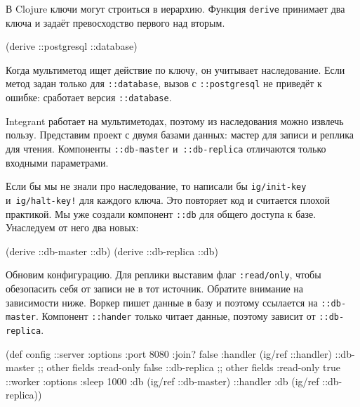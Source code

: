 
В Clojure ключи могут строиться в иерархию. Функция \verb|derive| принимает
два ключа и задаёт превосходство первого над вторым.


\begin{english}
  \begin{clojure}
(derive ::postgresql ::database)
  \end{clojure}
\end{english}

Когда мультиметод ищет действие по ключу, он учитывает наследование. Если метод
задан только для \verb|::database|, вызов с \verb|::postgresql| не приведёт к
ошибке: сработает версия \verb|::database|.

Integrant работает на мультиметодах, поэтому из наследования можно извлечь
пользу. Представим проект с двумя базами данных: мастер для записи и реплика для
чтения. Компоненты \verb|::db-master| и~\verb|::db-replica| отличаются только
входными параметрами.

Если бы мы не знали про наследование, то написали бы \verb|ig/init-key|
и~\verb|ig/halt-key!| для каждого ключа. Это повторяет код и считается плохой
практикой. Мы уже создали компонент \verb|::db| для общего доступа к
базе. Унаследуем от него два новых:

\begin{english}
  \begin{clojure}
(derive ::db-master ::db)
(derive ::db-replica ::db)
  \end{clojure}
\end{english}

Обновим конфигурацию. Для реплики выставим флаг \texttt{:read\-/only}, чтобы
обезопасить себя от записи не в тот источник. Обратите внимание на зависимости
ниже. Воркер пишет данные в базу и поэтому ссылается на
\verb|::db-master|. Компонент \verb|::hander| только читает данные,
поэтому зависит от \verb|::db-replica|.

\ifnarrow

\begin{english}
  \begin{clojure}
(def config
  {::server {:options {:port 8080
                       :join? false}
             :handler (ig/ref ::handler)}
   ::db-master {;; other fields
                :read-only false}
   ::db-replica {;; other fields
                 :read-only true}
   ::worker {:options {:sleep 1000}
             :db (ig/ref ::db-master)}
   ::handler {:db (ig/ref
                    ::db-replica)}})
  \end{clojure}
\end{english}

